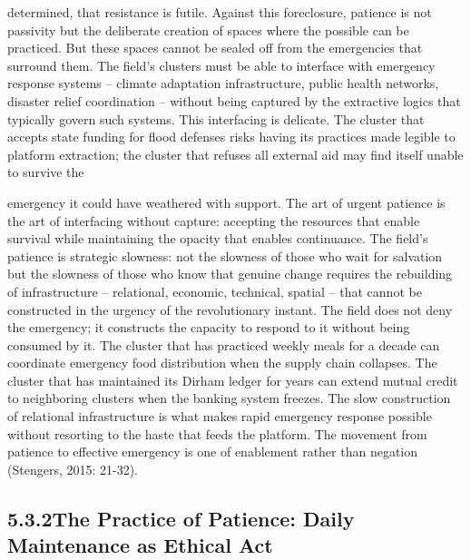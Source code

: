 determined, that resistance is futile. Against this foreclosure, patience is not passivity but the deliberate creation of spaces where the possible can be practiced. But these spaces cannot be sealed off from the emergencies that surround them. The field’s clusters must be able to interface with emergency response systems – climate adaptation infrastructure, public health networks, disaster relief coordination – without being captured by the extractive logics that typically govern such systems. This interfacing is delicate. The cluster that accepts state funding for flood defenses risks having its practices made legible to platform extraction; the cluster that refuses all external aid may find itself unable to survive the

emergency it could have weathered with support. The art of urgent patience is the art of interfacing without capture: accepting the resources that enable survival while maintaining the opacity that enables continuance. The field’s patience is strategic slowness: not the slowness of those who wait for salvation but the slowness of those who know that genuine change requires the rebuilding of infrastructure – relational, economic, technical, spatial – that cannot be constructed in the urgency of the revolutionary instant. The field does not deny the emergency; it constructs the capacity to respond to it without being consumed by it. The cluster that has practiced weekly meals for a decade can coordinate emergency food distribution when the supply chain collapses. The cluster that has maintained its Dirham ledger for years can extend mutual credit to neighboring clusters when the banking system freezes. The slow construction of relational infrastructure is what makes rapid emergency response possible without resorting to the haste that feeds the platform. The movement from patience to effective emergency is one of enablement rather than negation (Stengers, 2015: 21-32).

\subsection{5.3.2\quad The Practice of Patience: Daily Maintenance as Ethical Act}

